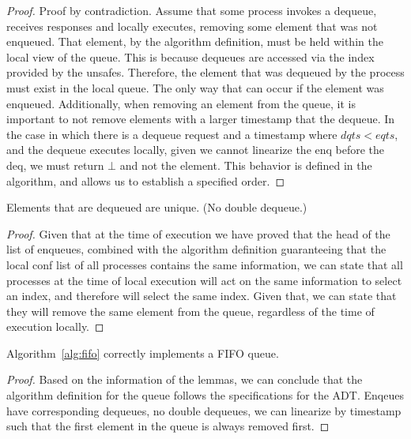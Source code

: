 \documentclass[a4paper,USenglish]{lipics-v2021} %
\begin{document}
\begin{proof}
Proof by contradiction. Assume that some process invokes a dequeue, receives responses and locally executes, removing some element that was not enqueued.  That element, by the algorithm definition, must be held within the local view of the queue. This is because dequeues are accessed via the index provided by the unsafes. Therefore, the element that was dequeued by the process must exist in the local queue. The only way that can occur if the element was enqueued.  Additionally, when removing an element from the queue, it is important to not remove elements with a larger timestamp that the dequeue. In the case in which there is a dequeue request and a timestamp where $dqts < eqts$, and the dequeue executes locally, given we cannot linearize the enq before the deq, we must return $\bot$ and not the element. This behavior is defined in the algorithm, and allows us to establish a specified order.
\end{proof}

\begin{lemma}
Elements that are dequeued are unique. (No double dequeue.)
\end{lemma}

\begin{proof}
Given that at the time of execution we have proved that the head of the list of enqueues, combined with the algorithm definition guaranteeing that the local conf list of all processes contains the same information, we can state that all processes at the time of local execution will act on the same information to select an index, and therefore will select the same index. Given that, we can state that they will remove the same element from the queue, regardless of the time of execution locally.
\end{proof}

\begin{theorem}
  Algorithm~\ref{alg:fifo} correctly implements a FIFO queue.
\end{theorem}

\begin{proof}
Based on the information of the lemmas, we can conclude that the algorithm definition for the queue follows the specifications for the ADT. Enqeues have corresponding dequeues, no double dequeues, we can linearize by timestamp such that the first element in the queue is always removed first.
\end{proof}

  
\end{document}
